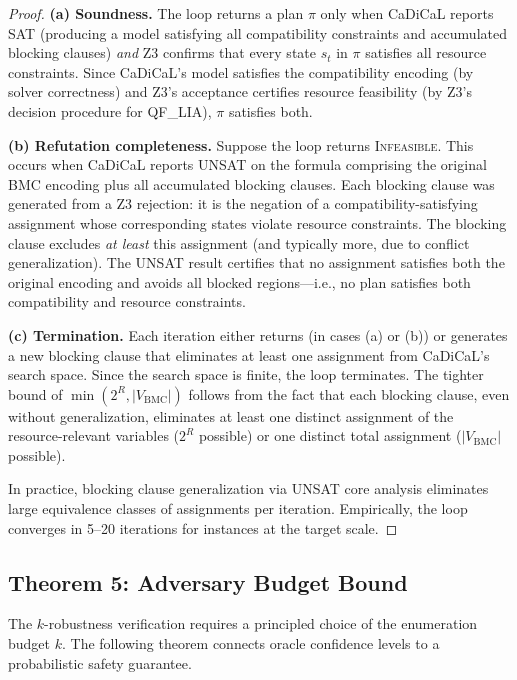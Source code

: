 \documentclass[10pt,twocolumn]{article}
\begin{document}
\begin{proof}
\textbf{(a) Soundness.} The loop returns a plan $\pi$ only when CaDiCaL reports SAT (producing a model satisfying all compatibility constraints and accumulated blocking clauses) \emph{and} Z3 confirms that every state $s_t$ in $\pi$ satisfies all resource constraints. Since CaDiCaL's model satisfies the compatibility encoding (by solver correctness) and Z3's acceptance certifies resource feasibility (by Z3's decision procedure for QF\_LIA), $\pi$ satisfies both.

\textbf{(b) Refutation completeness.} Suppose the loop returns \textsc{Infeasible}. This occurs when CaDiCaL reports UNSAT on the formula comprising the original BMC encoding plus all accumulated blocking clauses. Each blocking clause was generated from a Z3 rejection: it is the negation of a compatibility-satisfying assignment whose corresponding states violate resource constraints. The blocking clause excludes \emph{at least} this assignment (and typically more, due to conflict generalization). The UNSAT result certifies that no assignment satisfies both the original encoding and avoids all blocked regions---i.e., no plan satisfies both compatibility and resource constraints.

\textbf{(c) Termination.} Each iteration either returns (in cases (a) or (b)) or generates a new blocking clause that eliminates at least one assignment from CaDiCaL's search space. Since the search space is finite, the loop terminates. The tighter bound of $\min(2^R, |V_{\mathrm{BMC}}|)$ follows from the fact that each blocking clause, even without generalization, eliminates at least one distinct assignment of the resource-relevant variables ($2^R$ possible) or one distinct total assignment ($|V_{\mathrm{BMC}}|$ possible).

In practice, blocking clause generalization via UNSAT core analysis eliminates large equivalence classes of assignments per iteration. Empirically, the loop converges in 5--20 iterations for instances at the target scale.
\end{proof}

\subsection{Theorem 5: Adversary Budget Bound}
\label{sec:adversary-budget}

The $k$-robustness verification requires a principled choice of the enumeration budget $k$. The following theorem connects oracle confidence levels to a probabilistic safety guarantee.
\end{document}
